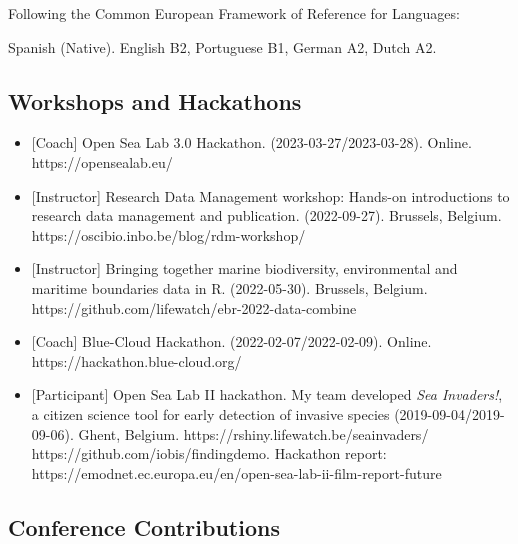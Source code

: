 \documentclass[
  16,
]{article}
\providecommand{\tightlist}{%
  \setlength{\itemsep}{0pt}\setlength{\parskip}{0pt}}\usepackage{longtable,booktabs,array}
\begin{document}
Following the Common European Framework of Reference for Languages:

Spanish (Native). English B2, Portuguese B1, German A2, Dutch A2.

\hypertarget{workshops-and-hackathons}{%
\subsection{Workshops and Hackathons}\label{workshops-and-hackathons}}

\begin{itemize}
\tightlist
\item
  {[}Coach{]} Open Sea Lab 3.0 Hackathon. (2023-03-27/2023-03-28).
  Online. https://opensealab.eu/
\item
  {[}Instructor{]} Research Data Management workshop: Hands-on
  introductions to research data management and publication.
  (2022-09-27). Brussels, Belgium.
  https://oscibio.inbo.be/blog/rdm-workshop/
\item
  {[}Instructor{]} Bringing together marine biodiversity, environmental
  and maritime boundaries data in R. (2022-05-30). Brussels, Belgium.
  https://github.com/lifewatch/ebr-2022-data-combine
\item
  {[}Coach{]} Blue-Cloud Hackathon. (2022-02-07/2022-02-09). Online.
  https://hackathon.blue-cloud.org/
\item
  {[}Participant{]} Open Sea Lab II hackathon. My team developed
  \emph{Sea Invaders!}, a citizen science tool for early detection of
  invasive species (2019-09-04/2019-09-06). Ghent, Belgium.
  https://rshiny.lifewatch.be/seainvaders/
  https://github.com/iobis/findingdemo. Hackathon report:
  https://emodnet.ec.europa.eu/en/open-sea-lab-ii-film-report-future
\end{itemize}

\hypertarget{conference-contributions}{%
\subsection{Conference Contributions}\label{conference-contributions}}
\end{document}
